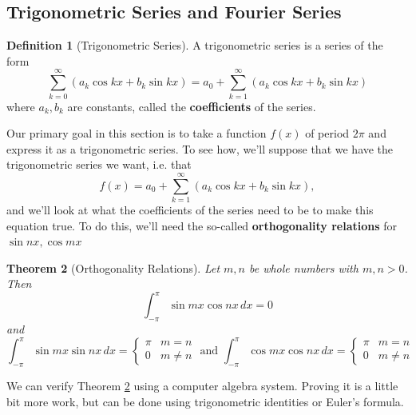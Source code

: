 \documentclass[10pt,]{book}
\newcommand{\terminology}[1]{\textbf{#1}}
\theoremstyle{plain}
\newtheorem{theorem}{Theorem}[section]
\theoremstyle{definition}
\newtheorem{definition}[theorem]{Definition}
\theoremstyle{definition}
\numberwithin{equation}{section}
\begin{document}
\subsection[{Trigonometric Series and Fourier Series}]{Trigonometric Series and Fourier Series}\label{subsection-trig-and-fourier-series}
\begin{definition}[{Trigonometric Series}]\label{definition-trigonometric-series}
A trigonometric series is a series of the form
                    \begin{equation*}\sum_{k=0}^{\infty}(a_{k}\cos kx+b_{k}\sin kx) = a_{0} + \sum_{k=1}^{\infty}(a_{k}\cos kx+b_{k}\sin kx)\end{equation*}
                    where \(a_{k},b_{k}\) are constants, called the \terminology{coefficients} of the series.%
\end{definition}
Our primary goal in this section is to take a function \(f(x)\) of period \(2\pi\) and express it as a trigonometric series. To see how, we'll suppose that we have the trigonometric series we want, i.e. that
            \begin{equation*}f(x) = a_{0} + \sum_{k=1}^{\infty}(a_{k}\cos kx+b_{k}\sin kx),\end{equation*}
            and we'll look at what the coefficients of the series need to be to make this equation true. To do this, we'll need the so-called \terminology{orthogonality relations} for \(\sin nx,\cos mx\)%
\begin{theorem}[{Orthogonality Relations}]\label{theorem-orthogonality-relations}
Let \(m,n\) be whole numbers with \(m,n>0\). Then
                    \begin{equation*}\int_{-\pi}^{\pi}\sin mx\cos nx\,dx = 0\end{equation*}
                    and
                    \begin{equation*}\int_{-\pi}^{\pi}\sin mx\sin nx\,dx = \begin{cases} \pi & m=n \\ 0 & m\neq n\end{cases}\text{ and }\int_{-\pi}^{\pi}\cos mx\cos nx\,dx = \begin{cases} \pi & m=n \\ 0 & m\neq n\end{cases}\end{equation*}%
\end{theorem}
\par
We can verify Theorem \hyperref[theorem-orthogonality-relations]{\ref{theorem-orthogonality-relations}} using a computer algebra system. Proving it is a little bit more work, but can be done using trigonometric identities or Euler's formula.%
\end{document}
